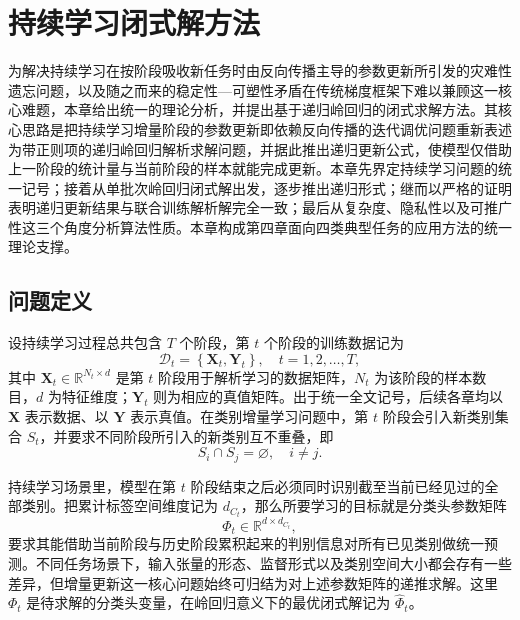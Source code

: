 \chapter{持续学习闭式解方法}

为解决持续学习在按阶段吸收新任务时由反向传播主导的参数更新所引发的灾难性遗忘问题，以及随之而来的稳定性—可塑性矛盾在传统梯度框架下难以兼顾这一核心难题，本章给出统一的理论分析，并提出基于递归岭回归的闭式求解方法。其核心思路是把持续学习增量阶段的参数更新即依赖反向传播的迭代调优问题重新表述为带正则项的递归岭回归解析求解问题，并据此推出递归更新公式，使模型仅借助上一阶段的统计量与当前阶段的样本就能完成更新。本章先界定持续学习问题的统一记号；接着从单批次岭回归闭式解出发，逐步推出递归形式；继而以严格的证明表明递归更新结果与联合训练解析解完全一致；最后从复杂度、隐私性以及可推广性这三个角度分析算法性质。本章构成第四章面向四类典型任务的应用方法的统一理论支撑。

\section{问题定义}

设持续学习过程总共包含 $T$ 个阶段，第 $t$ 个阶段的训练数据记为
\begin{equation}
\mathcal{D}_t=\left\{\mathbf{X}_t,\mathbf{Y}_t\right\}, \quad t=1,2,\ldots,T,
\end{equation}
其中 $\mathbf{X}_t \in \mathbb{R}^{N_t \times d}$ 是第 $t$ 阶段用于解析学习的数据矩阵，$N_t$ 为该阶段的样本数目，$d$ 为特征维度；$\mathbf{Y}_t$ 则为相应的真值矩阵。出于统一全文记号，后续各章均以 $\mathbf{X}$ 表示数据、以 $\mathbf{Y}$ 表示真值。在类别增量学习问题中，第 $t$ 阶段会引入新类别集合 $S_t$，并要求不同阶段所引入的新类别互不重叠，即
\begin{equation}
S_i \cap S_j = \varnothing, \quad i \neq j.
\end{equation}

持续学习场景里，模型在第 $t$ 阶段结束之后必须同时识别截至当前已经见过的全部类别。把累计标签空间维度记为 $d_{C_t}$，那么所要学习的目标就是分类头参数矩阵
\begin{equation}
\Phi_t \in \mathbb{R}^{d \times d_{C_t}},
\end{equation}
要求其能借助当前阶段与历史阶段累积起来的判别信息对所有已见类别做统一预测。不同任务场景下，输入张量的形态、监督形式以及类别空间大小都会存有一些差异，但增量更新这一核心问题始终可归结为对上述参数矩阵的递推求解。这里 $\Phi_t$ 是待求解的分类头变量，在岭回归意义下的最优闭式解记为 $\widehat{\Phi}_t$。

